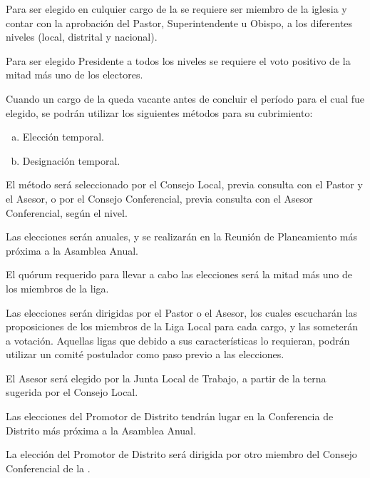 

\article
\label{requisito-cargos}
Para ser elegido en culquier cargo de la \LMJ{} se requiere ser miembro de la iglesia y contar con la aprobación del Pastor, Superintendente u Obispo, a los diferentes niveles (local, distrital y nacional).

\article
\label{requisito-presidente}
Para ser elegido Presidente a todos los niveles se requiere el voto positivo de la mitad más uno de los electores.

\article
\label{cargos-vacantes}
Cuando un cargo de la \LMJ{} queda vacante antes de concluir el período para el cual fue elegido, se podrán utilizar los siguientes métodos para su cubrimiento:
\begin{enumerate}[a)]
    \item Elección temporal.
    \item Designación temporal.
\end{enumerate}
El método será seleccionado por el Consejo Local, previa consulta con el Pastor y el Asesor, o por el Consejo Conferencial, previa consulta con el Asesor Conferencial, según el nivel.


\article
Las elecciones serán anuales, y se realizarán en la Reunión de Planeamiento más próxima a la Asamblea Anual.

\article
El quórum requerido para llevar a cabo las elecciones será la mitad más uno de los miembros de la liga.

\article
Las elecciones serán dirigidas por el Pastor o el Asesor, los cuales escucharán las proposiciones de los miembros de la Liga Local para cada cargo, y las someterán a votación. Aquellas ligas que debido a sus características lo requieran, podrán utilizar un comité postulador como paso previo a las elecciones.

\article
El Asesor será elegido por la Junta Local de Trabajo, a partir de la terna sugerida por el Consejo Local.


\article
Las elecciones del Promotor de Distrito tendrán lugar en la Conferencia de Distrito más próxima a la Asamblea Anual.

\article
\label{direccion-eleccion-promotor}
La elección del Promotor de Distrito será dirigida por otro miembro del Consejo Conferencial de la \LMJ{}.

